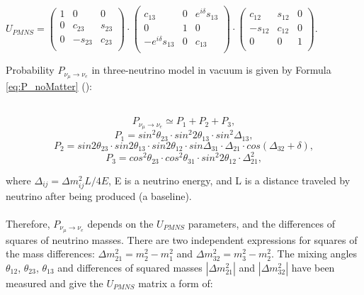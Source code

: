 \begin{center}
$U_{PMNS} =
 \begin{pmatrix}
  1 & 0 & 0 \\
  0 & c_{23} & s_{23} \\
  0 & -s_{23} & c_{23} \\
 \end{pmatrix}
 \cdot
 \begin{pmatrix}
  c_{13} & 0 & e^{i\delta}s_{13} \\
  0 & 1 & 0 \\
  -e^{i\delta}s_{13} & 0 & c_{13} \\
 \end{pmatrix}
 \cdot
 \begin{pmatrix}
  c_{12} & s_{12} & 0 \\
  -s_{12} & c_{12} & 0 \\
  0 & 0 & 1 \\
 \end{pmatrix}$. \\
\end{center}
Probability $P_{\nu_\mu \rightarrow \nu_e}$ in three-neutrino model in vacuum is given by Formula \ref{eq:P_noMatter} (\cite{ref_theory_Osc}): \\ \\
\begin{center}
\begin{equation}
\label{eq:P_noMatter}
P_{\nu_\mu \rightarrow \nu_e} \simeq P_1 + P_2 + P_3, 
\end{equation}
\begin{equation}
\label{eq:P_noMatter_1}
P_1 = sin^2{\theta_{23}} \cdot sin^2{2\theta_{13}} \cdot sin^2{\Delta_{13}},
\end{equation}
\begin{equation}
\label{eq:P_noMatter_2}
P_2 = sin2\theta_{23} \cdot sin2\theta_{13} \cdot sin2\theta_{12} \cdot sin{\Delta_{31}} \cdot \Delta_{21} \cdot cos(\Delta_{32}+\delta),
\end{equation}
\begin{equation}
\label{eq:P_noMatter_3}
P_3 = cos^2\theta_{23} \cdot cos^2\theta_{31} \cdot sin^2{2\theta_{12}} \cdot \Delta^2_{21},
\end{equation}
\end{center}
where $\Delta_{ij}={\Delta}m^2_{ij}L/4E$, E is a neutrino energy, and L is a distance traveled by neutrino after being produced (a baseline).\\ \\
Therefore, $P_{\nu_\mu \rightarrow \nu_e}$ depends on the $U_{PMNS}$ parameters, and the differences of squares of neutrino masses. There are two independent expressions for squares of the mass differences: ${\Delta}m_{21}^2 = m_2^2-m_1^2$ and ${\Delta}m_{32}^2 = m_3^2-m_2^2$. The mixing angles $\theta_{12}$, $\theta_{23}$, $\theta_{13}$ and differences of squared masses $|{\Delta}m_{21}^2|$ and $|{\Delta}m_{32}^2|$ have been measured and give the $U_{PMNS}$ matrix a form of:\\

